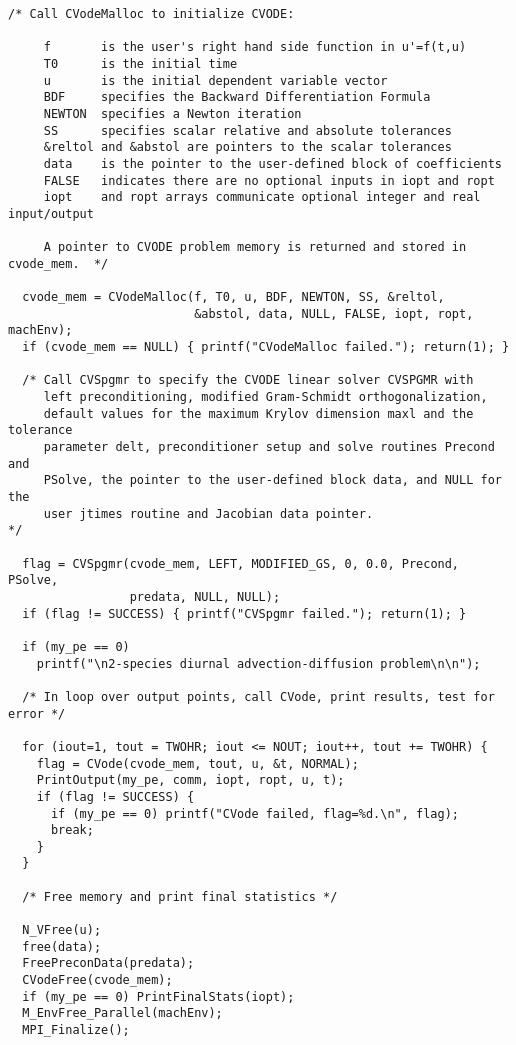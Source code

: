 \begin{verbatim}
/* Call CVodeMalloc to initialize CVODE: 

     f       is the user's right hand side function in u'=f(t,u)
     T0      is the initial time
     u       is the initial dependent variable vector
     BDF     specifies the Backward Differentiation Formula
     NEWTON  specifies a Newton iteration
     SS      specifies scalar relative and absolute tolerances
     &reltol and &abstol are pointers to the scalar tolerances
     data    is the pointer to the user-defined block of coefficients
     FALSE   indicates there are no optional inputs in iopt and ropt
     iopt    and ropt arrays communicate optional integer and real input/output

     A pointer to CVODE problem memory is returned and stored in cvode_mem.  */

  cvode_mem = CVodeMalloc(f, T0, u, BDF, NEWTON, SS, &reltol,
                          &abstol, data, NULL, FALSE, iopt, ropt, machEnv);
  if (cvode_mem == NULL) { printf("CVodeMalloc failed."); return(1); }

  /* Call CVSpgmr to specify the CVODE linear solver CVSPGMR with
     left preconditioning, modified Gram-Schmidt orthogonalization,
     default values for the maximum Krylov dimension maxl and the tolerance
     parameter delt, preconditioner setup and solve routines Precond and
     PSolve, the pointer to the user-defined block data, and NULL for the
     user jtimes routine and Jacobian data pointer.                          */

  flag = CVSpgmr(cvode_mem, LEFT, MODIFIED_GS, 0, 0.0, Precond, PSolve,
                 predata, NULL, NULL);
  if (flag != SUCCESS) { printf("CVSpgmr failed."); return(1); }

  if (my_pe == 0)
    printf("\n2-species diurnal advection-diffusion problem\n\n");

  /* In loop over output points, call CVode, print results, test for error */

  for (iout=1, tout = TWOHR; iout <= NOUT; iout++, tout += TWOHR) {
    flag = CVode(cvode_mem, tout, u, &t, NORMAL);
    PrintOutput(my_pe, comm, iopt, ropt, u, t);
    if (flag != SUCCESS) {
      if (my_pe == 0) printf("CVode failed, flag=%d.\n", flag);
      break;
    }
  }

  /* Free memory and print final statistics */  

  N_VFree(u);
  free(data);
  FreePreconData(predata);
  CVodeFree(cvode_mem);
  if (my_pe == 0) PrintFinalStats(iopt);
  M_EnvFree_Parallel(machEnv);
  MPI_Finalize();


\end{verbatim}
